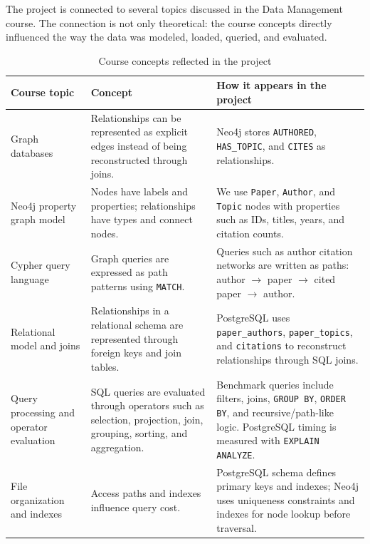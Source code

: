 \documentclass[11pt]{article}
\begin{document}
The project is connected to several topics discussed in the Data Management course.
The connection is not only theoretical: the course concepts directly influenced the way the data was modeled, loaded, queried, and evaluated.

\begin{table}[H]
\centering
\caption{Course concepts reflected in the project}
\label{tab:course-connection}
\small
\begin{tabular}{|p{}|p{}|p{}|}
\hline
\textbf{Course topic} & \textbf{Concept} & \textbf{How it appears in the project} \\
\hline
Graph databases & Relationships can be represented as explicit edges instead of being reconstructed through joins. & Neo4j stores \texttt{AUTHORED}, \texttt{HAS\_TOPIC}, and \texttt{CITES} as relationships. \\
\hline
Neo4j property graph model & Nodes have labels and properties; relationships have types and connect nodes. & We use \texttt{Paper}, \texttt{Author}, and \texttt{Topic} nodes with properties such as IDs, titles, years, and citation counts. \\
\hline
Cypher query language & Graph queries are expressed as path patterns using \texttt{MATCH}. & Queries such as author citation networks are written as paths: author \(\rightarrow\) paper \(\rightarrow\) cited paper \(\rightarrow\) author. \\
\hline
Relational model and joins & Relationships in a relational schema are represented through foreign keys and join tables. & PostgreSQL uses \texttt{paper\_authors}, \texttt{paper\_topics}, and \texttt{citations} to reconstruct relationships through SQL joins. \\
\hline
Query processing and operator evaluation & SQL queries are evaluated through operators such as selection, projection, join, grouping, sorting, and aggregation. & Benchmark queries include filters, joins, \texttt{GROUP BY}, \texttt{ORDER BY}, and recursive/path-like logic. PostgreSQL timing is measured with \texttt{EXPLAIN ANALYZE}. \\
\hline
File organization and indexes & Access paths and indexes influence query cost. & PostgreSQL schema defines primary keys and indexes; Neo4j uses uniqueness constraints and indexes for node lookup before traversal. \\
\hline
\end{tabular}
\normalsize
\end{table}
\end{document}
